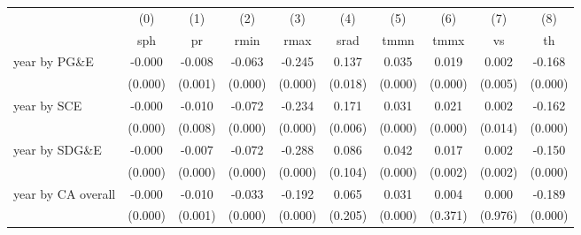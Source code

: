 \begin{tabular}{lccccccccc} \toprule 
 \midrule 
& (0)& (1)& (2)& (3)& (4)& (5)& (6)& (7)& (8)\\ 
& sph& pr& rmin& rmax& srad& tmmn& tmmx& vs& th\\ 
\midrule 
 year by PG\&E & -0.000  & -0.008  & -0.063  & -0.245  & 0.137  & 0.035  & 0.019  & 0.002  & -0.168 \\ 
 & (0.000)  & (0.001)  & (0.000)  & (0.000)  & (0.018)  & (0.000)  & (0.000)  & (0.005)  & (0.000) \\ 
year by SCE & -0.000  & -0.010  & -0.072  & -0.234  & 0.171  & 0.031  & 0.021  & 0.002  & -0.162 \\ 
 & (0.000)  & (0.008)  & (0.000)  & (0.000)  & (0.006)  & (0.000)  & (0.000)  & (0.014)  & (0.000) \\ 
year by SDG\&E & -0.000  & -0.007  & -0.072  & -0.288  & 0.086  & 0.042  & 0.017  & 0.002  & -0.150 \\ 
 & (0.000)  & (0.000)  & (0.000)  & (0.000)  & (0.104)  & (0.000)  & (0.002)  & (0.002)  & (0.000) \\ 
year by CA overall & -0.000  & -0.010  & -0.033  & -0.192  & 0.065  & 0.031  & 0.004  & 0.000  & -0.189 \\ 
 & (0.000)  & (0.001)  & (0.000)  & (0.000)  & (0.205)  & (0.000)  & (0.371)  & (0.976)  & (0.000) \\ 
\bottomrule 
\end{tabular}